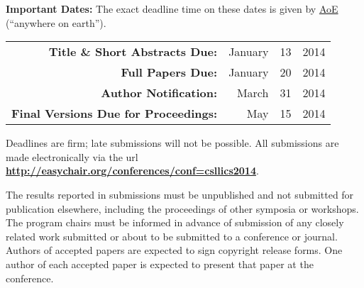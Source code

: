 \documentclass[oneside]{article}
\begin{document}
{\begin{minipage}[t]{\rightcol}
   \noindent%
   \textbf{Important Dates:}
The exact deadline time on these dates is given by
   \href{http://www.ieee802.org/16/aoe.html}{AoE} (``anywhere on earth'').
  \begin{center}
    \hspace{-8em} \small
    \begin{tabular}[c]{rr@{\ }r@{,\ }l}
      \textbf{Title \& Short Abstracts Due:}
      & January & 13 & 2014 \\
      \textbf{Full Papers Due:}
      & January & 20 & 2014 \\
      \textbf{Author Notification:}
      & March   & 31 & 2014 \\
      \textbf{Final Versions Due for Proceedings:}
      & May     & 15 & 2014
    \end{tabular}
  \end{center}
  Deadlines are firm; late submissions will not be possible.
  All submissions are made electronically via the url
  \textbf{\url{http://easychair.org/conferences/conf=csllics2014}}.

  The results reported in submissions must be unpublished and not submitted for
  publication elsewhere, including the proceedings of other symposia or workshops.
  The program chairs must be informed in advance of submission of any closely
  related work submitted or about to be submitted to a conference or journal.
  Authors of accepted papers are expected to sign copyright release forms.
  One author of each accepted paper is expected to present that paper at the conference.

  \medskip

%


\end{minipage}}
\end{document}
